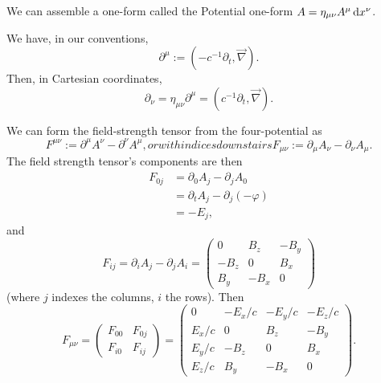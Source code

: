 \begin{remark}
We can assemble a one-form called the Potential one-form
$A = \eta_{\mu\nu}A^{\mu}\,\mathrm{d} x^{\nu}$.
\end{remark}

We have, in our conventions,
\begin{equation}
\partial^{\mu} := (-c^{-1}\partial_{t}, \vec{\nabla}).
\end{equation}
Then, in Cartesian coordinates,
\begin{equation}
\partial_{\nu} = \eta_{\mu\nu}\partial^{\mu} = (c^{-1}\partial_{t}, \vec{\nabla}).
\end{equation}

We can form the field-strength tensor from the four-potential as
\begin{subequations}
\begin{equation}
F^{\mu\nu} := \partial^{\mu}A^{\nu} - \partial^{\nu}A^{\mu},
\end{equation}
or with indices downstairs
\begin{equation}
F_{\mu\nu} := \partial_{\mu}A_{\nu} - \partial_{\nu}A_{\mu}.
\end{equation}
\end{subequations}
The field strength tensor's components are then
\begin{subequations}
\begin{align}
F_{0j} &= \partial_{0}A_{j} - \partial_{j}A_{0}\\
&= \partial_{t}A_{j} - \partial_{j}(-\varphi)\\
&= -E_{j},
\end{align}
\end{subequations}
and
\begin{equation}
F_{ij} = \partial_{i}A_{j} - \partial_{j}A_{i} = \begin{pmatrix}
 0     &  B_{z} & -B_{y}\\
-B_{z} &  0     & B_{x}\\
 B_{y} & -B_{x} & 0
\end{pmatrix}
\end{equation}
(where $j$ indexes the columns, $i$ the rows). Then
\begin{equation}
F_{\mu\nu} = \begin{pmatrix}F_{00} & F_{0j}\\
F_{i0} & F_{ij}
\end{pmatrix} = \begin{pmatrix}
 0       & -E_{x}/c & -E_{y}/c & -E_{z}/c\\
 E_{x}/c &  0       &  B_{z}   & -B_{y}\\
 E_{y}/c & -B_{z}   &  0       &  B_{x}\\
 E_{z}/c &  B_{y}   & -B_{x}   &  0
\end{pmatrix}.
\end{equation}

